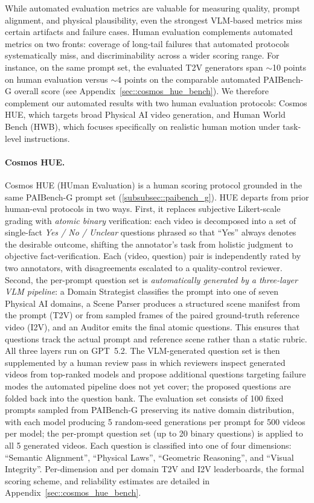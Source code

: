 While automated evaluation metrics are valuable for measuring quality, prompt alignment, and physical plausibility, even the strongest VLM-based metrics miss certain artifacts and failure cases. Human evaluation complements automated metrics on two fronts: coverage of long-tail failures that automated protocols systematically miss, and discriminability across a wider scoring range. For instance, on the same prompt set, the evaluated T2V generators span $\sim$10 points on human evaluation versus $\sim$4 points on the comparable automated PAIBench-G overall score (see Appendix~\ref{sec::cosmos_hue_bench}). We therefore complement our automated results with two human evaluation protocols: Cosmos HUE, which targets broad Physical AI video generation, and Human World Bench (HWB), which focuses specifically on realistic human motion under task-level instructions.

\paragraph{Cosmos HUE.} Cosmos HUE (HUman Evaluation) is a human scoring protocol grounded in the same PAIBench-G prompt set (\cref{subsubsec::paibench_g}). HUE departs from prior
human-eval protocols in two ways. First, it replaces subjective Likert-scale grading with \emph{atomic binary} verification: each video is decomposed into a set of single-fact \emph{Yes / No / Unclear} questions phrased so that ``Yes'' always denotes the desirable outcome, shifting the annotator's task from holistic judgment to objective fact-verification. Each (video, question) pair is independently rated by two annotators, with disagreements escalated to a quality-control reviewer.   Second, the per-prompt question set is \emph{automatically generated by a three-layer VLM pipeline}: a Domain Strategist classifies the prompt into one of seven Physical AI domains, a Scene Parser produces a structured scene manifest from the prompt (T2V) or from sampled frames of the paired ground-truth reference video (I2V), and an Auditor emits the final atomic questions. This ensures that questions track the actual prompt and reference scene rather than a static rubric. All three layers run on GPT~5.2. The VLM-generated question set is then supplemented by a human review pass in which reviewers inspect generated videos from top-ranked models and propose additional questions targeting failure modes the automated pipeline does not yet cover; the proposed questions are folded back into the question bank. The evaluation set consists of 100 fixed prompts sampled from PAIBench-G preserving its native domain distribution, with each model producing 5 random-seed generations per prompt for 500 videos per model; the per-prompt question set (up to 20 binary questions) is applied to all 5 generated videos. Each question is classified into one of four dimensions: ``Semantic Alignment'', ``Physical Laws'', ``Geometric Reasoning'', and ``Visual Integrity''. Per-dimension and per domain T2V and I2V leaderboards, the formal scoring scheme, and reliability estimates are detailed in Appendix~\ref{sec::cosmos_hue_bench}.


